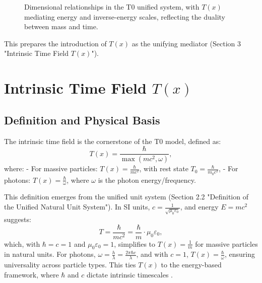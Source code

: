 \documentclass[12pt,a4paper]{article}
\newcommand{\Tfield}{T(x)}
\newcommand{\Tzero}{T_0}
\begin{document}
	\begin{figure}[ht]
		\centering
		\caption{Dimensional relationships in the T0 unified system, with \(\Tfield\) mediating energy and inverse-energy scales, reflecting the duality between mass and time.}
		\label{fig:dimensions}
	\end{figure}
	
	This prepares the introduction of \(\Tfield\) as the unifying mediator (Section 3 "Intrinsic Time Field \(\Tfield\)").
	
	\section{Intrinsic Time Field \(\Tfield\)}
	\label{sec:intrinsic_time}
	
	\subsection{Definition and Physical Basis}
	\label{subsec:time_definition}
	
	The intrinsic time field is the cornerstone of the T0 model, defined as:
	\begin{equation}
		\Tfield = \frac{\hbar}{\max(mc^2, \omega)},
		\label{eq:intrinsic_time}
	\end{equation}
	where:
	- For massive particles: \(\Tfield = \frac{\hbar}{mc^2}\), with rest state \(\Tzero = \frac{\hbar}{m_0 c^2}\),
	- For photons: \(\Tfield = \frac{\hbar}{\omega}\), where \(\omega\) is the photon energy/frequency.
	
	This definition emerges from the unified unit system (Section 2.2 "Definition of the Unified Natural Unit System"). In SI units, \(c = \frac{1}{\sqrt{\mu_0\varepsilon_0}}\), and energy \(E = mc^2\) suggests:
	\begin{equation}
		T = \frac{\hbar}{mc^2} = \frac{\hbar}{m} \cdot \mu_0\varepsilon_0,
		\label{eq:time_em}
	\end{equation}
	which, with \(\hbar = c = 1\) and \(\mu_0\varepsilon_0 = 1\), simplifies to \(\Tfield = \frac{1}{m}\) for massive particles in natural units. For photons, \(\omega = \frac{h}{\lambda} = \frac{2\pi\hbar c}{\lambda}\), and with \(c = 1\), \(\Tfield = \frac{\hbar}{\omega}\), ensuring universality across particle types. This ties \(\Tfield\) to the energy-based framework, where \(\hbar\) and \(c\) dictate intrinsic timescales \cite{pascher_lagrange_2025}.
	
\end{document}
